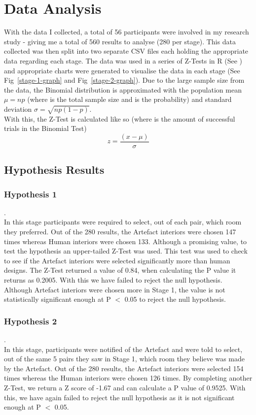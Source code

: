 \section{Data Analysis}
With the data I collected, a total of 56 participants were involved in my research study - giving me a total of 560 results to analyse (280 per stage). This data collected was then split into two separate CSV files each holding the appropriate data regarding each stage. The data was used in a series of Z-Tests in R (See \hyperref[append:g]{}) and appropriate charts were generated to visualise the data in each stage (See Fig~\ref{stage-1-graph} and Fig~\ref{stage-2-graph}).
Due to the large sample size from the data, the Binomial distribution is approximated with the population mean \(\mu = np\) (where  is the total sample size and  is the probability) and standard deviation \(\sigma = \sqrt{np(1-p)}\). 
\\
With this, the Z-Test is calculated like so (where  is the amount of successful trials in the Binomial Test)
\[z = \frac{(x - \mu ) }{\sigma }\]

\subsection{Hypothesis Results}
\subsubsection{Hypothesis 1}
.\\
In this stage participants were required to select, out of each pair, which room they preferred. Out of the 280 results, the Artefact interiors were chosen 147 times whereas Human interiors were chosen 133. Although a promising value, to test the hypothesis an upper-tailed Z-Test was used.
This test was used to check to see if the Artefact interiors were selected significantly more than human designs. The Z-Test returned a value of 0.84, when calculating the P value it returns as 0.2005. With this we have failed to reject the null hypothesis. Although Artefact interiors were chosen more in Stage 1, the value is not statistically significant enough at P $<$ 0.05 to reject the null hypothesis.
\subsubsection{Hypothesis 2}
.\\
In this stage, participants were notified of the Artefact and were told to select, out of the same 5 pairs they saw in Stage 1, which room they believe was made by the Artefact. Out of the 280 results, the Artefact interiors were selected 154 times whereas the Human interiors were chosen 126 times. By completing another Z-Test, we return a Z score of -1.67 and can calculate a P value of 0.9525. With this, we have again failed to reject the null hypothesis as it is not significant enough at P $<$ 0.05.

